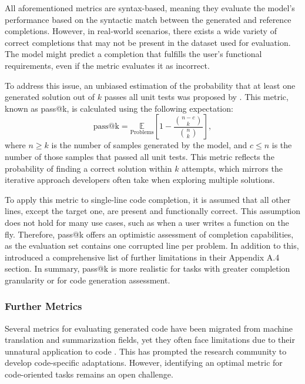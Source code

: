 \begin{sloppypar}
All aforementioned metrics are syntax-based, meaning they evaluate the model's performance based on the syntactic match between the generated and reference completions. However, in real-world scenarios, there exists a wide variety of correct completions that may not be present in the dataset used for evaluation. The model might predict a completion that fulfills the user's functional requirements, even if the metric evaluates it as incorrect.
\end{sloppypar}

To address this issue, an unbiased estimation of the probability that at least one generated solution out of \(k\) passes all unit tests was proposed by \citet{chen2021}. This metric, known as pass@k, is calculated using the following expectation:
\begin{equation}
    \text{pass@k} = \underset{\mathrm{Problems}}{\mathbb{E}}\left[1 - \frac{\binom{n-c}{k}}{\binom{n}{k}}\right],
\end{equation}
where \(n \ge k\) is the number of samples generated by the model, and \(c \le n\) is the number of those samples that passed all unit tests. This metric reflects the probability of finding a correct solution within \(k\) attempts, which mirrors the iterative approach developers often take when exploring multiple solutions.

To apply this metric to single-line code completion, it is assumed that all other lines, except the target one, are present and functionally correct. This assumption does not hold for many use cases, such as when a user writes a function on the fly. Therefore, pass@k offers an optimistic assessment of completion capabilities, as the evaluation set contains one corrupted line per problem. In addition to this, \citet{liu2024} introduced a comprehensive list of further limitations in their Appendix A.4 section. In summary, pass@k is more realistic for tasks with greater completion granularity or for code generation assessment.

\subsubsection*{Further Metrics}

Several metrics for evaluating generated code have been migrated from machine translation and summarization fields, yet they often face limitations due to their unnatural application to code \parencite{evtikhiev2022}. This has prompted the research community to develop code-specific adaptations. However, identifying an optimal metric for code-oriented tasks remains an open challenge.

